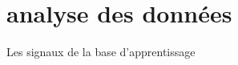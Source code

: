 \hypertarget{analysedesdonnees}{%
\chapter{analyse des données}\label{analyse des données}}

Les signaux de la base d'apprentissage
